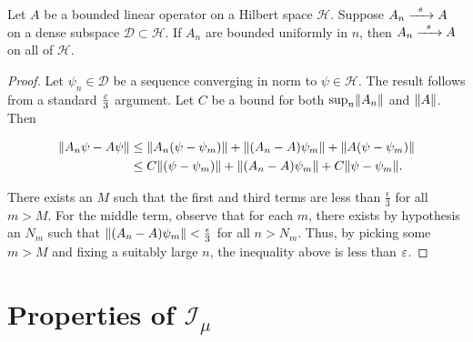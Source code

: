 \documentclass[12pt, letterpaper]{article}
\begin{document}
\begin{lemma}
Let $A$ be a bounded linear operator on a Hilbert space $\mathcal{H}$. Suppose $A_n \xrightarrow{\enskip s \enskip} A$ on a dense subspace $\mathcal{D}\subset \mathcal{H}$. If $A_n$ are bounded uniformly in $n$, then $A_n \xrightarrow{\enskip s \enskip} A$ on all of $\mathcal{H}$.
\label{lemma:densesubspace}
\end{lemma}
\begin{proof}
Let $\psi_n \in\mathcal{D}$ be a sequence converging in norm to $\psi\in\mathcal{H}$. The result follows from a standard $\frac{\varepsilon}{3}$ argument. Let $C$ be a bound for both $\sup_n \lVert A_n \rVert$ and $\lVert A \rVert$. Then 

\[\begin{aligned}
\lVert A_n\psi-A\psi \rVert &\leq \lVert A_n(\psi-\psi_m) \rVert + \lVert (A_n-A)\psi_m \rVert + \lVert A(\psi-\psi_m) \rVert\\
&\leq C\lVert (\psi-\psi_m) \rVert + \lVert (A_n-A)\psi_m \rVert + C\lVert \psi-\psi_m \rVert.
\end{aligned}\]

There exists an $M$ such that the first and third terms are less than $\frac{\epsilon}{3}$ for all $m>M$. For the middle term, observe that for each $m$, there exists by hypothesis an $N_m$ such that $\lVert (A_n-A)\psi_m \rVert < \frac{\epsilon}{3}$ for all $n>N_m$. Thus, by picking some $m>M$ and fixing a suitably large $n$, the inequality above is less than $\varepsilon$.
\end{proof}

\section{Properties of $\mathcal{I}_\mu$}
\end{document}
